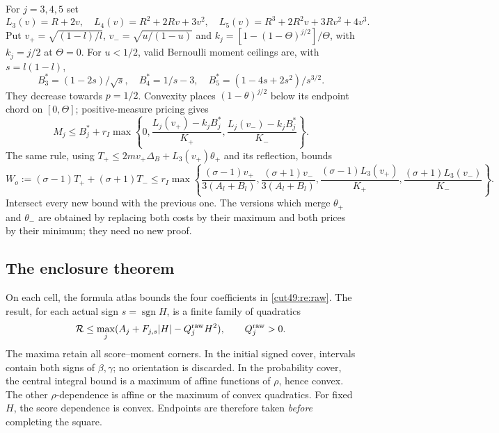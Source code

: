 \documentclass[11pt,a4paper]{article}
\numberwithin{equation}{section}
\theoremstyle{definition}
\theoremstyle{remark}
\begin{document}
For $j=3,4,5$ set
\[
 L_3(v)=R+2v,\quad L_4(v)=R^2+2Rv+3v^2,
 \quad L_5(v)=R^3+2R^2v+3Rv^2+4v^3.
\]
Put $v_+=\sqrt{(1-l)/l}$, $v_-=\sqrt{u/(1-u)}$ and
$k_j=[1-(1-\Theta)^{j/2}]/\Theta$, with $k_j=j/2$ at $\Theta=0$.
For $u<1/2$, valid Bernoulli moment ceilings are, with $s=l(1-l)$,
\[
 B_3^*=(1-2s)/\sqrt s,\quad B_4^*=1/s-3,
 \quad B_5^*=(1-4s+2s^2)/s^{3/2}.
\]
They decrease towards $p=1/2$. Convexity places $(1-\theta)^{j/2}$
below its endpoint chord on $[0,\Theta]$; positive-measure pricing gives
\begin{equation}\label{cut49:re:moments}
 M_j\le B_j^*+r_I\max\left\{0,
 \frac{L_j(v_+)-k_jB_j^*}{K_+},
 \frac{L_j(v_-)-k_jB_j^*}{K_-}\right\}.
\end{equation}
The same rule, using
$T_+\le2mv_+\Delta_B+L_3(v_+)\theta_+$ and its reflection, bounds
\begin{equation}\label{cut49:re:outerresource}
 W_o:=(\sigma-1)T_++(\sigma+1)T_-
 \le r_I\max\left\{
 \frac{(\sigma-1)v_+}{3(A_l+B_l)},
 \frac{(\sigma+1)v_-}{3(A_l+B_l)},
 \frac{(\sigma-1)L_3(v_+)}{K_+},
 \frac{(\sigma+1)L_3(v_-)}{K_-}\right\}.
\end{equation}
Intersect every new bound with the previous one. The versions which
merge $\theta_+$ and $\theta_-$ are obtained by replacing both costs by
their maximum and both prices by their minimum; they need no new proof.

\subsection{The enclosure theorem}\label{cut49:re:operator}
On each cell, the formula atlas bounds the four coefficients in
\eqref{cut49:re:raw}. The result, for each actual sign $s=\operatorname{sgn}H$,
is a finite family of quadratics
\begin{equation}\label{cut49:re:quadratics}
 \mathcal R\le\max_j(A_j+F_{j,s}|H|-Q_j^{\rm raw}H^2),
 \qquad Q_j^{\rm raw}>0.
\end{equation}
The maxima retain all score--moment corners. In the initial signed
cover, intervals contain both signs of $\beta,\gamma$; no orientation is
discarded. In the probability cover, the central integral bound is a
maximum of affine functions of $\rho$, hence convex. The other
$\rho$-dependence is affine or the maximum of convex quadratics. For
fixed $H$, the score dependence is convex. Endpoints are therefore taken
\emph{before} completing the square.
\end{document}

